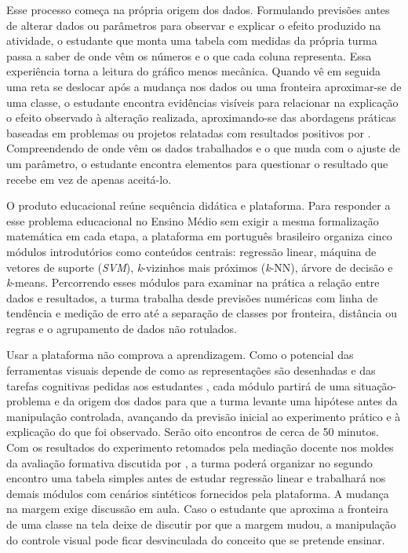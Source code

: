 Esse processo começa na própria origem dos dados. Formulando previsões antes de alterar dados ou parâmetros para observar e explicar o efeito produzido na atividade, o estudante que monta uma tabela com medidas da própria turma passa a saber de onde vêm os números e o que cada coluna representa. Essa experiência torna a leitura do gráfico menos mecânica. Quando vê em seguida uma reta se deslocar após a mudança nos dados ou uma fronteira aproximar-se de uma classe, o estudante encontra evidências visíveis para relacionar na explicação o efeito observado à alteração realizada, aproximando-se das abordagens práticas baseadas em problemas ou projetos relatadas com resultados positivos por . Compreendendo de onde vêm os dados trabalhados e o que muda com o ajuste de um parâmetro, o estudante encontra elementos para questionar o resultado que recebe em vez de apenas aceitá-lo.

O produto educacional reúne sequência didática e plataforma. Para responder a esse problema educacional no Ensino Médio sem exigir a mesma formalização matemática em cada etapa, a plataforma em português brasileiro organiza cinco módulos introdutórios como conteúdos centrais: regressão linear, máquina de vetores de suporte (\textit{SVM}), \textit{k}-vizinhos mais próximos (\textit{k}-NN), árvore de decisão e \textit{k}-means. Percorrendo esses módulos para examinar na prática a relação entre dados e resultados, a turma trabalha desde previsões numéricas com linha de tendência e medição de erro até a separação de classes por fronteira, distância ou regras e o agrupamento de dados não rotulados.

Usar a plataforma não comprova a aprendizagem. Como o potencial das ferramentas visuais depende de como as representações são desenhadas e das tarefas cognitivas pedidas aos estudantes \cite{ainsworth2006deft}, cada módulo partirá de uma situação-problema e da origem dos dados para que a turma levante uma hipótese antes da manipulação controlada, avançando da previsão inicial ao experimento prático e à explicação do que foi observado. Serão oito encontros de cerca de 50 minutos. Com os resultados do experimento retomados pela mediação docente nos moldes da avaliação formativa discutida por , a turma poderá organizar no segundo encontro uma tabela simples antes de estudar regressão linear e trabalhará nos demais módulos com cenários sintéticos fornecidos pela plataforma. A mudança na margem exige discussão em aula. Caso o estudante que aproxima a fronteira de uma classe na tela deixe de discutir por que a margem mudou, a manipulação do controle visual pode ficar desvinculada do conceito que se pretende ensinar.

